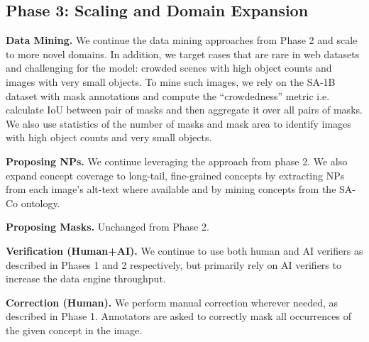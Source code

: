 \documentclass[]{fairmeta}
\newcommand{\dsname}{{SA-Co}\xspace}
\renewcommand{\paragraph}[1]{%
	\noindent\textbf{#1.}\noindent\xspace%
}
\begin{document}
\subsection{Phase 3: Scaling and Domain Expansion}
\paragraph{Data Mining} We continue the data mining approaches from Phase 2 and scale to more novel domains. In addition, we target cases that are rare in web datasets and challenging for the model: crowded scenes with high object counts and images with very small objects. To mine such images, we rely on the SA-1B dataset with mask annotations and compute the ``crowdedness'' metric i.e. calculate IoU between pair of masks and then aggregate it over all pairs of masks. 
We also use statistics of the number of masks and mask area to identify images with high object counts and very small objects.

\paragraph{Proposing NPs} We continue leveraging the approach from phase 2. We also expand concept coverage to long-tail, fine-grained concepts by extracting NPs from each image’s alt-text where available and by mining concepts from the \dsname ontology.

\paragraph{Proposing Masks} Unchanged from Phase 2.

\paragraph{Verification (Human+AI)} We continue to use both human and AI verifiers as described in Phases 1 and 2 respectively, but primarily rely on AI verifiers to increase the data engine throughput.

\paragraph{Correction (Human)} We perform manual correction wherever needed, as described in Phase 1. Annotators are asked to correctly mask all occurrences of the given concept in the image. 


	
	
\end{document}
